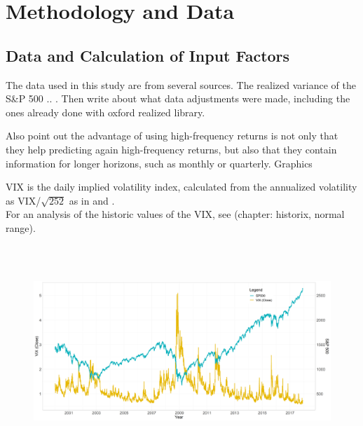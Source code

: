 
\section{Methodology and Data}

\subsection{Data and Calculation of Input Factors}
The data used in this study are from several sources. The realized variance of the S\&P 500 .. . Then write about what data adjustments were made, including the ones already done with oxford realized library.

Also \citeauthor{andersen2003} point out the advantage of using high-frequency returns is not only that they help predicting again high-frequency returns, but also that they contain information for longer horizons, such as monthly or quarterly. 
Graphics

VIX is the daily implied volatility index, calculated from the annualized volatility as VIX/$\sqrt{252}$ as in \textcite{blair2000} and \textcite{whaley2008}. \\

For an analysis of the historic values of the VIX, see \textcite{whaley2008} (chapter: historix, normal range). 


\begin{figure}[!htbp]
\includegraphics[width=16cm, height=8cm]{pictures/SPandViX.png}
\end{figure}

